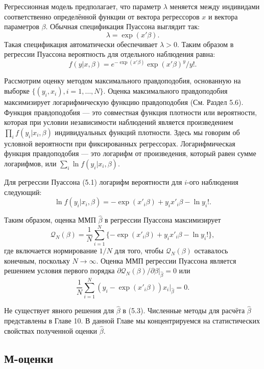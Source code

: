 Регрессионная модель предполагает, что параметр $\lambda$ меняется между индивидами соответственно определённой функции от вектора регрессоров $x$ и вектора параметров $\beta$. Обычная спецификация Пуассона выглядит так:
\[
\lambda = \exp(x'\beta).
\]
Такая спецификация автоматически обеспечивает $\lambda > 0$. Таким образом в регрессии Пуассона вероятность для отдельного наблюдения равна:
\begin{equation}
f(y|x,\beta)= e^{-\exp(x'\beta)} \exp(x'\beta)^{y}/y!.
\end{equation}

Рассмотрим оценку методом максимального правдоподобия, основанную на выборке $\{(y_i,x_i),i=1, \dots, N \}$. Оценка максимального правдоподобия максимизирует логарифмическую функцию правдоподобия (См. Раздел 5.6). Функция правдоподобия --- это совместная функция плотности или вероятности, которая при условии независимости наблюдений является произведением $\prod_i f(y_i|x_i,\beta)$ индивидуальных функций плотности. Здесь мы говорим об условной вероятности при фиксированных регрессорах. Логарифмическая функция правдоподобия --- это логарифм от произведения, который равен сумме логарифмов, или $\sum_i{\ln f(y_i|x_i,\beta)}$.

Для регрессии Пуассона (5.1) логарифм вероятности для $i$-ого наблюдения следующий:
\[
\ln f(y_i|x_i,\beta)= -\exp(x'_i\beta)+ y_i x'_i \beta - \ln y_i!.
\]

Таким образом, оценка ММП $\hat{\beta}$ в регрессии Пуассона максимизирует
\begin{equation}
\mathcal{Q}_N(\beta)= \frac{1}{N} \sum_{i=1}^{N}\{-\exp(x'_i\beta)+ y_i x'_i \beta - \ln y_i!\},
\end{equation}
где включается нормирование $1/N$ для того, чтобы $\mathcal{Q}_N(\beta)$ оставалось конечным, поскольку $N \rightarrow \infty $. Оценка ММП регрессии Пуассона является решением условия первого порядка $ \left. \partial \mathcal{Q}_N(\beta) / \partial \beta \right|_{\hat{\beta}} = 0$ или
\begin{equation}
\frac{1}{N} \sum_{i=1}^{N}(y_i-\exp(x'_i\beta))x_i |_{\hat{\beta}}=0.
\end{equation}

Не существует явного решения для $\hat{\beta}$ в (5.3). Численные методы для расчёта $\hat{\beta}$ представлены в Главе 10. В данной Главе мы концентрируемся на статистических свойствах полученной оценки $\hat{\beta}$.

\subsection{М-оценки}

